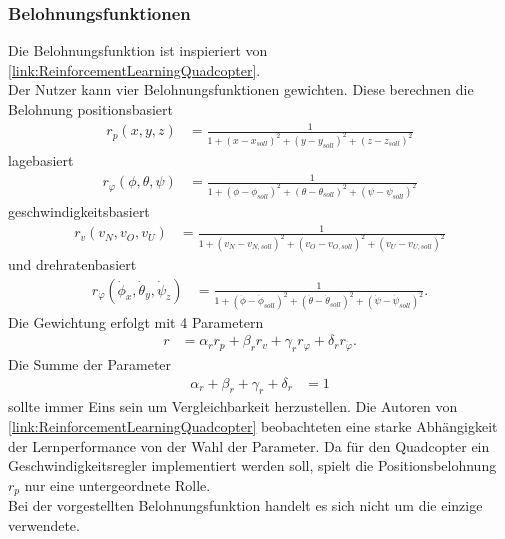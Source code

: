 \subsubsection{\label{Belohnung}Belohnungsfunktionen}
Die Belohnungsfunktion ist inspieriert von \ref{link:ReinforcementLearningQuadcopter}. \\
Der Nutzer kann vier Belohnungsfunktionen gewichten.
Diese berechnen die Belohnung positionsbasiert
\begin{align}
r_p(x, y, z) &= \frac{1}{1 + (x - x_{soll})^2 + (y - y_{soll})^2 + (z - z_{soll})^2}
\end{align}
lagebasiert
\begin{align}
r_{\varphi}(\phi, \theta, \psi) &= \frac{1}{1 + (\phi - \phi_{soll})^2 + (\theta - \theta_{soll})^2 + (\psi - \psi_{soll})^2}
\end{align}
geschwindigkeitsbasiert
\begin{align}
r_v(v_{N}, v_{O}, v_{U}) &= \frac{1}{1 + (v_{N} - v_{N, soll})^2 + (v_{O} - v_{O, soll})^2 + (v_{U} - v_{U, soll})^2}
\end{align}
und drehratenbasiert
\begin{align}
r_{\dot{\varphi}}(\dot{\phi}_x, \dot{\theta}_y, \dot{\psi}_z) &= \frac{1}{1 + (\dot{\phi} - \dot{\phi}_{soll})^2 + (\dot{\theta} - \dot{\theta}_{soll})^2 + (\dot{\psi} - \dot{\psi}_{soll})^2}.
\end{align}
Die Gewichtung erfolgt mit 4 Parametern 
\begin{align}
r &= \alpha_r r_p + \beta_r r_v + \gamma_r r_{\varphi} + \delta_r r_{\dot{\varphi}}.
\end{align}
Die Summe der Parameter
\begin{align}
\alpha_r + \beta_r + \gamma_r + \delta_r &= 1 
\end{align}
sollte immer Eins sein um Vergleichbarkeit herzustellen.
Die Autoren von \ref{link:ReinforcementLearningQuadcopter} beobachteten eine starke Abhängigkeit der Lernperformance von der Wahl der Parameter. Da für den Quadcopter ein Geschwindigkeitsregler implementiert werden soll, spielt die Positionsbelohnung $r_p$ nur eine untergeordnete Rolle.\\
Bei der vorgestellten Belohnungsfunktion handelt es sich nicht um die einzige verwendete.

